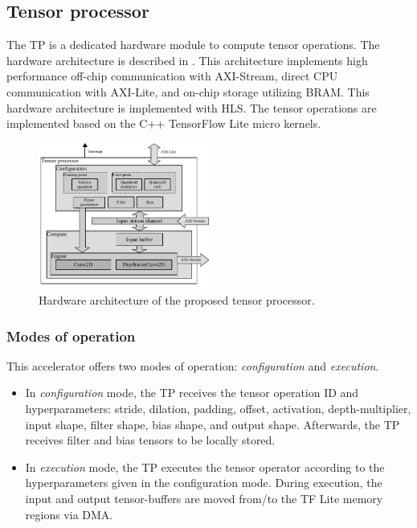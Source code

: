 \subsection{\textbf{Tensor processor}}
The TP is a dedicated hardware module to compute tensor operations. The hardware architecture is described in . This architecture implements high performance off-chip communication with AXI-Stream, direct CPU communication with AXI-Lite, and on-chip storage utilizing BRAM. This hardware architecture is implemented with HLS. The tensor operations are implemented based on the C++ TensorFlow Lite micro kernels.
\begin{figure}[h!]
	\centering
	\includegraphics[width=0.5\textwidth]{../figures/accelerator.pdf}
	\caption{Hardware architecture of the proposed tensor processor.}
	\label{fig:accelerator}
\end{figure}
\subsubsection{\textbf{Modes of operation}} This accelerator offers two modes of operation: \emph{configuration} and \emph{execution}.
\begin{itemize}
	\item In \emph{configuration} mode, the TP receives the tensor operation ID and hyperparameters: stride, dilation, padding, offset, activation, depth-multiplier, input shape, filter shape, bias shape, and output shape. Afterwards, the TP receives filter and bias tensors to be locally stored.
	
	\item In \emph{execution} mode, the TP executes the tensor operator according to the hyperparameters given in the configuration mode. During execution, the input and output tensor-buffers are moved from/to the TF Lite memory regions via DMA.
\end{itemize}
